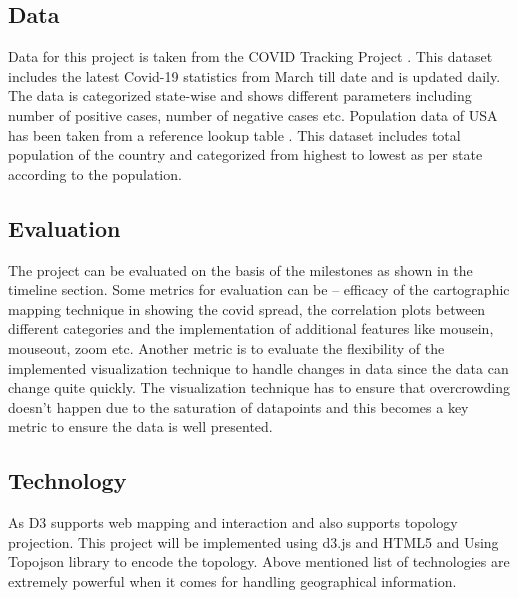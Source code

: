 \subsection{Data}
\label{sec:data}

Data for this project is taken from the COVID Tracking Project \cite{CTP}. This dataset includes the latest Covid-19 statistics from March till date and is updated daily. The data is categorized state-wise and shows different parameters including number of positive cases, number of negative cases etc. Population data of USA has been taken from a reference lookup table \cite{PopData}. This dataset includes total population of the country and categorized from highest to lowest as per state according to the population. 

\subsection{Evaluation}
\label{sec:eval}

The project can be evaluated on the basis of the milestones as shown in the timeline section. Some metrics for evaluation can be – efficacy of the cartographic mapping technique in showing the covid spread, the correlation plots between different categories and the implementation of additional features like mousein, mouseout, zoom etc.
Another metric is to evaluate the flexibility of the implemented visualization technique to handle changes in data since the data can change quite quickly. The visualization technique has to ensure that overcrowding doesn’t happen due to the saturation of datapoints and this becomes a key metric to ensure the data is well presented.

\subsection{Technology}
\label{sec:tech}

As D3 \cite{d3js} supports web mapping and interaction and also supports topology projection. This project will be implemented using d3.js and HTML5 and Using Topojson library \cite{top} to encode the topology. 
Above mentioned list of technologies are extremely powerful when it comes for handling geographical information. 



